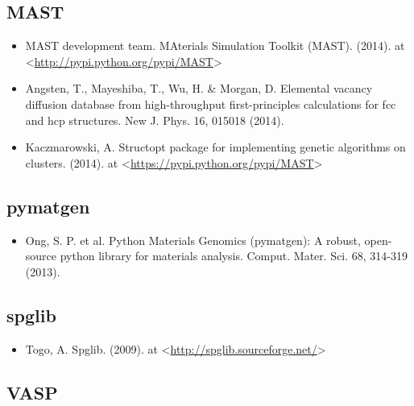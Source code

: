 \documentclass[letterpaper,10pt,english]{sphinxmanual}
\begin{document}
\subsection{MAST}
\label{15_0_citations:mast}\begin{itemize}
\item {} 
MAST development team. MAterials Simulation Toolkit (MAST). (2014). at \textless{}\href{http://pypi.python.org/pypi/MAST}{http://pypi.python.org/pypi/MAST}\textgreater{}

\item {} 
Angsten, T., Mayeshiba, T., Wu, H. \& Morgan, D. Elemental vacancy diffusion database from high-throughput first-principles calculations for fcc and hcp structures. New J. Phys. 16, 015018 (2014).

\item {} 
Kaczmarowski, A. Structopt package for implementing genetic algorithms on clusters. (2014). at \textless{}\href{https://pypi.python.org/pypi/MAST}{https://pypi.python.org/pypi/MAST}\textgreater{}

\end{itemize}


\subsection{pymatgen}
\label{15_0_citations:pymatgen}\begin{itemize}
\item {} 
Ong, S. P. et al. Python Materials Genomics (pymatgen): A robust, open-source python library for materials analysis. Comput. Mater. Sci. 68, 314-319 (2013).

\end{itemize}


\subsection{spglib}
\label{15_0_citations:spglib}\begin{itemize}
\item {} 
Togo, A. Spglib. (2009). at \textless{}\href{http://spglib.sourceforge.net/}{http://spglib.sourceforge.net/}\textgreater{}

\end{itemize}


\subsection{VASP}
\label{15_0_citations:vasp}
\end{document}
